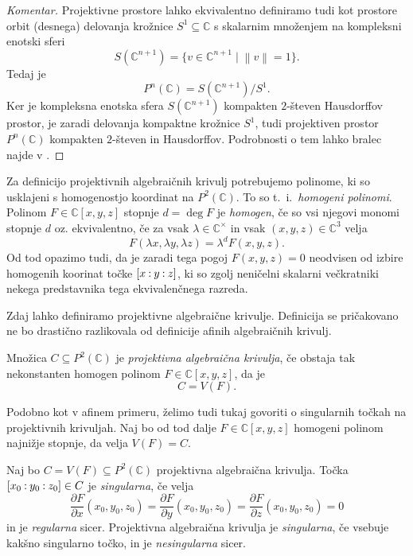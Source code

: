 \documentclass[mat1]{fmfdelo}
\newcommand{\C}{\mathbb C}
\newcommand{\CM}{\mathbb C ^\times}
\newcommand{\PC}{P^2(\mathbb C)}
\newcommand{\pcoor}[1]{%
  \begingroup\lccode`~=`: \lowercase{\endgroup
  \edef~}{\mathbin{\mathchar\the\mathcode`:}\nobreak}%
  [%
  \begingroup
  \mathcode`:=\string"8000
  #1%
  \endgroup
  ]%
}
\newcommand{\pdv}[2][]{\frac{\partial#1}{\partial#2}}
\theoremstyle{definition}
\newenvironment{komentar}[1][Komentar]{\begin{proof}[#1]\let\qed\relax}{\end{proof}}
\begin{document}
\begin{komentar}
    Projektivne prostore lahko ekvivalentno definiramo tudi kot prostore orbit (desnega) delovanja krožnice $S^1 \subseteq \C$ s skalarnim množenjem na kompleksni enotski sferi 
    \[
        S(\C^{n+1}) = \{v \in \C^{n+1} \mid \left\lVert v\right\rVert = 1\}.
    \]
    Tedaj je
    \[
        P^n(\C) = S(\C^{n+1})/S^1.
    \]
    Ker je kompleksna enotska sfera $S(\C^{n+1})$ kompakten $2$-števen Hausdorffov prostor, je zaradi delovanja kompaktne krožnice $S^1$, tudi projektiven prostor $P^n(\C)$ kompakten $2$-števen in Hausdorffov. Podrobnosti o tem lahko bralec najde v 
    \cite[Zgled 3.43. (2)]{MrcunTop}.
\end{komentar}

Za definicijo projektivnih algebraičnih krivulj potrebujemo  polinome, ki so usklajeni s homogenostjo koordinat na $\PC$. To so t.~i.\ \emph{homogeni polinomi}. Polinom $F \in \C[x,y,z]$ stopnje $d = \deg F$ je \emph{homogen}, če so vsi njegovi monomi stopnje $d$ oz. ekvivalentno, če za vsak $\lambda \in \CM$ in vsak $(x,y,z) \in \C^3$ velja
\[
    F(\lambda x, \lambda y, \lambda z) = \lambda^d F(x,y,z). 
\]
Od tod opazimo tudi, da je zaradi tega pogoj $F(x,y,z) = 0$ neodvisen od izbire homogenih koorinat točke $\pcoor{x : y : z}$, ki so zgolj neničelni skalarni večkratniki nekega predstavnika tega ekvivalenčnega razreda.  

Zdaj lahko definiramo projektivne algebraične krivulje. Definicija se pričakovano ne bo drastično razlikovala od definicije afinih algebraičnih krivulj.

\begin{definicija}
    Množica $C \subseteq \PC$ je \emph{projektivna algebraična krivulja}, če obstaja tak nekonstanten homogen polinom $F \in \C[x,y,z]$, da je
    \[
        C = V(F). 
    \]
\end{definicija}

Podobno kot v afinem primeru, želimo tudi tukaj govoriti o singularnih točkah na projektivnih krivuljah. Naj bo od tod dalje $F \in \C[x,y,z]$ homogeni polinom najnižje stopnje, da velja $V(F) = C$.

\begin{definicija}
    Naj bo $C = V(F) \subseteq \PC$ projektivna algebraična krivulja. Točka $\pcoor{x_0:y_0:z_0} \in C$ je \emph{singularna}, če velja
    \[
        \pdv[F]{x}(x_0, y_0, z_0) = \pdv[F]{y}(x_0, y_0, z_0) = \pdv[F]{z}(x_0, y_0, z_0) = 0
    \]
    in je \emph{regularna} sicer. Projektivna algebraična krivulja je \emph{singularna}, če vsebuje kakšno singularno točko, in je \emph{nesingularna} sicer.
\end{definicija}
\end{document}

